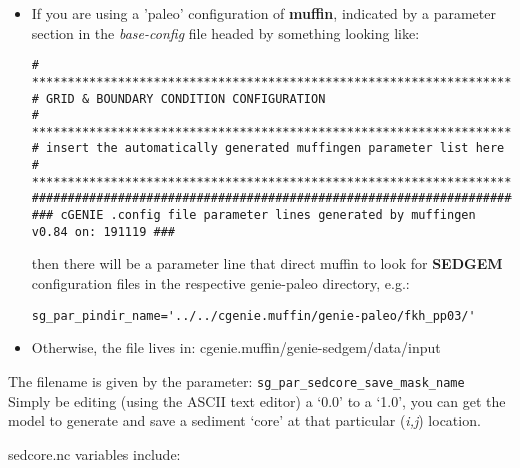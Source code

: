 \documentclass[11pt,fleqn]{book} %
\begin{document}
\begin{itemize}[noitemsep]
\vspace{1mm}
\item
If you are using a 'paleo' configuration of \textbf{muffin}, indicated by a parameter section in the \textit{base-config} file headed by something looking like:
\footnotesize\begin{verbatim}
# *******************************************************************
# GRID & BOUNDARY CONDITION CONFIGURATION
# *******************************************************************
# insert the automatically generated muffingen parameter list here
# *******************************************************************
###################################################################################
### cGENIE .config file parameter lines generated by muffingen v0.84 on: 191119 ###
\end{verbatim}\normalsize
then there will be a parameter line that direct muffin to look for \textbf{SEDGEM} configuration files in the respective \textsf{\footnotesize genie-paleo } directory, e.g.:
\vspace{-1mm}\small\begin{verbatim}
sg_par_pindir_name='../../cgenie.muffin/genie-paleo/fkh_pp03/'
\end{verbatim}\normalsize\vspace{-1mm}
\vspace{1mm}
\item Otherwise, the file lives in: \textsf{\footnotesize cgenie.muffin/genie-sedgem/data/input}
\end{itemize}
\vspace{1mm}
The filename is given by the parameter: \texttt{sg\_par\_sedcore\_save\_mask\_name}
\\Simply be editing (using the ASCII text editor) a ‘0.0’ to a ‘1.0’, you can get the model to generate and save a sediment ‘core’ at that particular (\textit{i,j}) location.

\pagebreak

\textsf{\footnotesize sedcore.nc } variables include:
\end{document}
